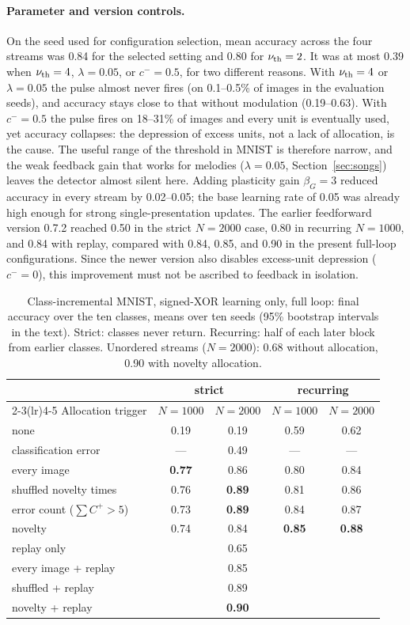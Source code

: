 \documentclass[11pt,a4paper]{article}
\begin{document}
\paragraph{Parameter and version controls.}
On the seed used for configuration selection, mean accuracy across the four streams was 0.84 for the selected setting and 0.80 for $\nu_{\rm th}=2$. It was at most 0.39 when $\nu_{\rm th}=4$, $\lambda=0.05$, or $c^-=0.5$, for two different reasons. With $\nu_{\rm th}=4$ or $\lambda=0.05$ the pulse almost never fires (on 0.1--0.5\% of images in the evaluation seeds), and accuracy stays close to that without modulation (0.19--0.63). With $c^-=0.5$ the pulse fires on 18--31\% of images and every unit is eventually used, yet accuracy collapses: the depression of excess units, not a lack of allocation, is the cause. The useful range of the threshold in MNIST is therefore narrow, and the weak feedback gain that works for melodies ($\lambda=0.05$, Section~\ref{sec:songs}) leaves the detector almost silent here. Adding plasticity gain $\beta_G=3$ reduced accuracy in every stream by 0.02--0.05; the base learning rate of 0.05 was already high enough for strong single-presentation updates. The earlier feedforward version 0.7.2 reached 0.50 in the strict $N=2000$ case, 0.80 in recurring $N=1000$, and 0.84 with replay, compared with 0.84, 0.85, and 0.90 in the present full-loop configurations. Since the newer version also disables excess-unit depression ($c^-=0$), this improvement must not be ascribed to feedback in isolation.

\begin{table}[t]\small\centering
\caption{Class-incremental MNIST, signed-XOR learning only, full loop: final accuracy over the ten classes, means over ten seeds (95\% bootstrap intervals in the text). Strict: classes never return. Recurring: half of each later block from earlier classes. Unordered streams ($N=2000$): 0.68 without allocation, 0.90 with novelty allocation.}\label{tab:mnist}
\begin{tabular}{@{}lcccc@{}}
\toprule
& \multicolumn{2}{c}{strict} & \multicolumn{2}{c}{recurring} \\
\cmidrule(lr){2-3}\cmidrule(lr){4-5}
Allocation trigger & $N=1000$ & $N=2000$ & $N=1000$ & $N=2000$ \\
\midrule
none & 0.19 & 0.19 & 0.59 & 0.62 \\
classification error & --- & 0.49 & --- & --- \\
every image & \textbf{0.77} & 0.86 & 0.80 & 0.84 \\
shuffled novelty times & 0.76 & \textbf{0.89} & 0.81 & 0.86 \\
error count ($\sum C^+>5$) & 0.73 & \textbf{0.89} & 0.84 & 0.87 \\
novelty & 0.74 & 0.84 & \textbf{0.85} & \textbf{0.88} \\
\midrule
replay only & & 0.65 & & \\
every image + replay & & 0.85 & & \\
shuffled + replay & & 0.89 & & \\
novelty + replay & & \textbf{0.90} & & \\
\bottomrule
\end{tabular}
\end{table}
\end{document}
